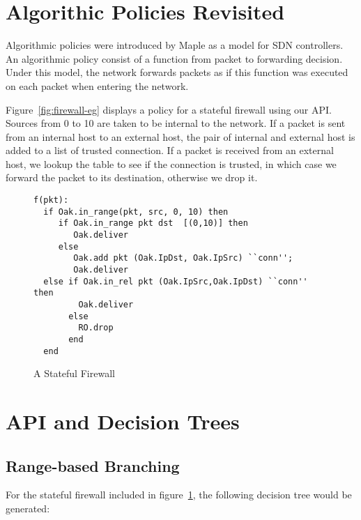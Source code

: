 \documentclass[11pt]{article}
\begin{document}
\section*{Algorithic Policies Revisited}
Algorithmic policies were introduced by Maple as a model for SDN controllers. An algorithmic policy consist of a function from packet to forwarding decision. Under this model, the network forwards packets as if this function was executed on each packet when entering the network. 

Figure~\ref{fig:firewall-eg} displays a policy for a stateful firewall using our API. Sources from 0 to 10 are taken to be internal to the network. If a packet is sent from an internal host to an external host, the pair of internal and external host is added to a list of trusted connection. If a packet is received from an external host, we lookup the table to see if the connection is trusted, in which case we forward the packet to its destination, otherwise we drop it.


\begin{figure}
\begin{lstlisting}
f(pkt):
  if Oak.in_range(pkt, src, 0, 10) then
     if Oak.in_range pkt dst  [(0,10)] then
        Oak.deliver
     else 
        Oak.add pkt (Oak.IpDst, Oak.IpSrc) ``conn'';
        Oak.deliver
  else if Oak.in_rel pkt (Oak.IpSrc,Oak.IpDst) ``conn'' then
         Oak.deliver
       else
         RO.drop
       end
  end                
  \end{lstlisting}
\label{fig:firewallcode}
\caption{A Stateful Firewall}
\end{figure}




\section*{API and Decision Trees}
   \subsection*{Range-based Branching}


   
   

  For the stateful firewall included in figure~\ref{fig:firewallcode}, the following decision tree would be generated:
\end{document}
